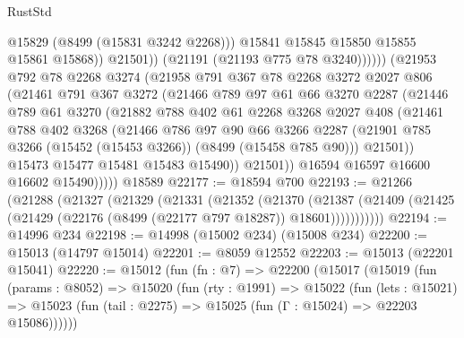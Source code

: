 \begin{lexlean}{RustStd}
\begin{coremodule}
                            @15829
                            (@8499 (@15831 @3242 @2268)))
                          @15841
                          @15845
                          @15850
                          @15855
                          @15861
                          @15868))
                      @21501))
                  (@21191 (@21193 @775 @78 @3240))))))
          (@21953
            @792
            @78
            @2268
            @3274
            (@21958
              @791
              @367
              @78
              @2268
              @3272
              @2027
              @806
              (@21461
                @791
                @367
                @3272
                (@21466
                  @789
                  @97
                  @61
                  @66
                  @3270
                  @2287
                  (@21446
                    @789
                    @61
                    @3270
                    (@21882
                      @788
                      @402
                      @61
                      @2268
                      @3268
                      @2027
                      @408
                      (@21461
                        @788
                        @402
                        @3268
                        (@21466
                          @786
                          @97
                          @90
                          @66
                          @3266
                          @2287
                          (@21901 @785 @3266 (@15452 (@15453 @3266)) (@8499 (@15458 @785 @90)))
                          @21501))
                      @15473
                      @15477
                      @15481
                      @15483
                      @15490))
                  @21501))
              @16594
              @16597
              @16600
              @16602
              @15490)))))
    @18589
@22177 := @18594 @700
@22193 := @21266
    (@21288
      (@21327
        (@21329
          (@21331
            (@21352
              (@21370
                (@21387
                  (@21409 (@21425 (@21429 (@22176 (@8499 (@22177 @797 @18287)) @18601)))))))))))
@22194 := @14996 @234
@22198 := @14998 (@15002 @234) (@15008 @234)
@22200 := @15013 (@14797 @15014)
@22201 := @8059 @12552
@22203 := @15013 (@22201 @15041)
@22220 := @15012
    (fun (fn : @7) =>
    @22200
      (@15017
        (@15019
          (fun (params : @8052) =>
          @15020
            (fun (rty : @1991) =>
            @15022
              (fun (lets : @15021) =>
              @15023 (fun (tail : @2275) => @15025 (fun (Γ : @15024) => @22203 @15086))))))

\end{coremodule}
\end{lexlean}
